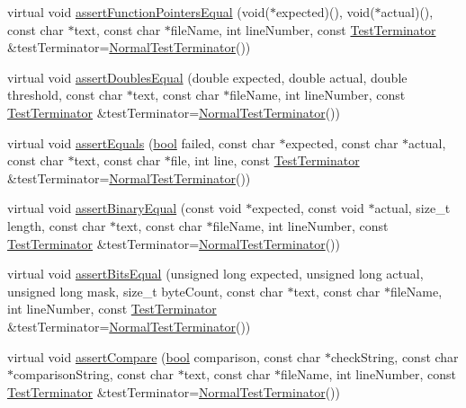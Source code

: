 \begin{DoxyCompactItemize}
\item 
virtual void \hyperlink{class_utest_shell_a48b33046ec189f0ce733205276afafa7}{assert\+Function\+Pointers\+Equal} (void($\ast$expected)(), void($\ast$actual)(), const char $\ast$text, const char $\ast$file\+Name, int line\+Number, const \hyperlink{class_test_terminator}{Test\+Terminator} \&test\+Terminator=\hyperlink{class_normal_test_terminator}{Normal\+Test\+Terminator}())
\item 
virtual void \hyperlink{class_utest_shell_a6bfdff112553fb1e8414903c2d4a0858}{assert\+Doubles\+Equal} (double expected, double actual, double threshold, const char $\ast$text, const char $\ast$file\+Name, int line\+Number, const \hyperlink{class_test_terminator}{Test\+Terminator} \&test\+Terminator=\hyperlink{class_normal_test_terminator}{Normal\+Test\+Terminator}())
\item 
virtual void \hyperlink{class_utest_shell_aeecd2ef3112bdf517a53d945cf0a818d}{assert\+Equals} (\hyperlink{avb__gptp_8h_af6a258d8f3ee5206d682d799316314b1}{bool} failed, const char $\ast$expected, const char $\ast$actual, const char $\ast$text, const char $\ast$file, int line, const \hyperlink{class_test_terminator}{Test\+Terminator} \&test\+Terminator=\hyperlink{class_normal_test_terminator}{Normal\+Test\+Terminator}())
\item 
virtual void \hyperlink{class_utest_shell_a6dbe5191c5d05ec4a24eb51c76f79dfa}{assert\+Binary\+Equal} (const void $\ast$expected, const void $\ast$actual, size\+\_\+t length, const char $\ast$text, const char $\ast$file\+Name, int line\+Number, const \hyperlink{class_test_terminator}{Test\+Terminator} \&test\+Terminator=\hyperlink{class_normal_test_terminator}{Normal\+Test\+Terminator}())
\item 
virtual void \hyperlink{class_utest_shell_a95aea59049d74e55ea6c4f93e1102856}{assert\+Bits\+Equal} (unsigned long expected, unsigned long actual, unsigned long mask, size\+\_\+t byte\+Count, const char $\ast$text, const char $\ast$file\+Name, int line\+Number, const \hyperlink{class_test_terminator}{Test\+Terminator} \&test\+Terminator=\hyperlink{class_normal_test_terminator}{Normal\+Test\+Terminator}())
\item 
virtual void \hyperlink{class_utest_shell_ace2ccdca6c6f8622960979f25304c013}{assert\+Compare} (\hyperlink{avb__gptp_8h_af6a258d8f3ee5206d682d799316314b1}{bool} comparison, const char $\ast$check\+String, const char $\ast$comparison\+String, const char $\ast$text, const char $\ast$file\+Name, int line\+Number, const \hyperlink{class_test_terminator}{Test\+Terminator} \&test\+Terminator=\hyperlink{class_normal_test_terminator}{Normal\+Test\+Terminator}())

\end{DoxyCompactItemize}
